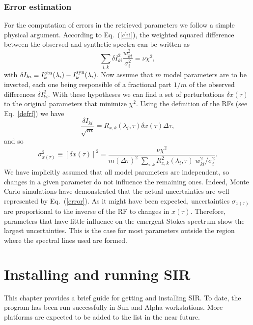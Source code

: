 \documentclass[11pt]{report}
\begin{document}
\subsection{Error estimation}
For the computation of errors in the retrieved parameters we 
follow a simple physical argument. According to Eq.\ (\ref{chi}), the weighted 
squared difference between the observed and synthetic spectra 
can be written as 
\begin{equation}
\sum_{i,k} \delta I^2_{ki} \frac{w^2_{ki}}{\sigma_i^2} = \nu \chi^2,
\end{equation}
with $\delta I_{ki} \equiv I^{\rm obs}_k(\lambda_i) - 
I^{\rm syn}_k(\lambda_i)$. Now assume that $m$ model parameters 
are to be inverted, each one being responsible of a fractional part 
$1/m$ of the observed differences $\delta I^2_{ki}$. With these hypotheses 
we can find a set of perturbations $\delta x(\tau)$ to the original parameters 
that minimize $\chi^2$. Using the definition of the RFs (see Eq.\ \ref{defrf}) 
we have 
\begin{equation}
\frac{\delta I_{ki}}{\sqrt{m}}  = R_{x,k}(\lambda_i,\tau) \delta x(\tau) 
\Delta \tau,
\end{equation}
and so
\begin{equation}
\label{error}
\sigma^2_{x(\tau)} \equiv [\delta x(\tau)]^2 = \frac{\nu \chi^2}{m (\Delta \tau)^2 \;
\sum_{i,k} R^2_{x,k}(\lambda_i,\tau) \; w^2_{ki}/\sigma^2_i}.
\end{equation}
We have implicitly assumed that all model parameters are independent, so
changes in a given parameter do not influence the remaining ones. Indeed, 
Monte Carlo simulations have demonstrated that the actual uncertainties 
are well represented by Eq.\ (\ref{error}).  As it might have been 
expected, uncertainties $\sigma_{x(\tau)}$ are proportional to the inverse 
of the RF to changes in $x(\tau)$. Therefore, parameters that have little 
influence on the emergent Stokes spectrum show the largest uncertainties. 
This is the case for most parameters outside the region where the 
spectral lines used are formed.


\chapter{Installing and running SIR}
This chapter provides a brief guide for getting and installing SIR. To
date, the program has been run successfully in Sun and Alpha
workstations. More platforms are expected to be added to the list in
the near future. 
\end{document}
